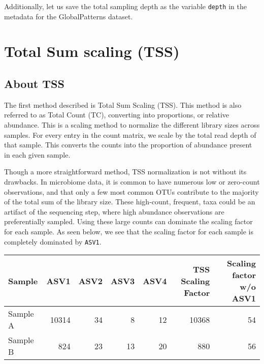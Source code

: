 \documentclass[
]{book}
\newenvironment{Shaded}{\begin{snugshade}}{\end{snugshade}}
\newcommand{\KeywordTok}[1]{\textcolor[rgb]{0.13,0.29,0.53}{\textbf{#1}}}
\newcommand{\NormalTok}[1]{#1}
\newcommand{\OperatorTok}[1]{\textcolor[rgb]{0.81,0.36,0.00}{\textbf{#1}}}
\newcommand{\StringTok}[1]{\textcolor[rgb]{0.31,0.60,0.02}{#1}}
\begin{document}
Additionally, let us save the total sampling depth as the variable \texttt{depth} in the metadata for the GlobalPatterns dataset.

\begin{Shaded}
\end{Shaded}

\hypertarget{total-sum-scaling-tss}{%
\chapter{Total Sum scaling (TSS)}\label{total-sum-scaling-tss}}

\hypertarget{about-tss}{%
\section{About TSS}\label{about-tss}}

The first method described is Total Sum Scaling (TSS). This method is also referred to as Total Count (TC), converting into proportions, or relative abundance. This is a scaling method to normalize the different library sizes across samples. For every entry in the count matrix, we scale by the total read depth of that sample. This converts the counts into the proportion of abundance present in each given sample.

Though a more straightforward method, TSS normalization is not without its drawbacks. In microbiome data, it is common to have numerous low or zero-count observations, and that only a few most common OTUs contribute to the majority of the total sum of the library size. These high-count, frequent, taxa could be an artifact of the sequencing step, where high abundance observations are preferentially sampled. Using these large counts can dominate the scaling factor for each sample. As seen below, we see that the scaling factor for each sample is completely dominated by \texttt{ASV1}.

\begin{tabular}{l|r|r|r|r|r|r}
\hline
Sample & ASV1 & ASV2 & ASV3 & ASV4 & TSS Scaling Factor & Scaling factor w/o ASV1\\
\hline
Sample A & 10314 & 34 & 8 & 12 & 10368 & 54\\
\hline
Sample B & 824 & 23 & 13 & 20 & 880 & 56\\
\hline
\end{tabular}
\end{document}

